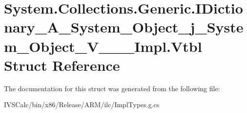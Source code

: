 \hypertarget{struct_system_1_1_collections_1_1_generic_1_1_i_dictionary___a___system___object__j___system___object___v_______impl_1_1_vtbl}{}\section{System.\+Collections.\+Generic.\+I\+Dictionary\+\_\+\+A\+\_\+\+System\+\_\+\+Object\+\_\+j\+\_\+\+System\+\_\+\+Object\+\_\+\+V\+\_\+\+\_\+\+\_\+\+Impl.\+Vtbl Struct Reference}
\label{struct_system_1_1_collections_1_1_generic_1_1_i_dictionary___a___system___object__j___system___object___v_______impl_1_1_vtbl}


The documentation for this struct was generated from the following file\+:\begin{DoxyCompactItemize}
\item 
I\+V\+S\+Calc/bin/x86/\+Release/\+A\+R\+M/ilc/Impl\+Types.\+g.\+cs\end{DoxyCompactItemize}
